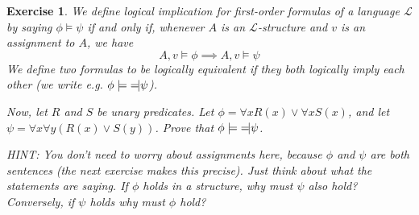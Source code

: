 \documentclass{article}
\theoremstyle{plain}
\newtheorem{Q}[theorem]{Exercise}{\bfseries}{\upshape}
\newcommand{\sL}{\mathscr{L}}
\newcommand{\lequiv}{\models\text{\reflectbox{$\models$}}}
\begin{document}
\begin{Q}\label{\prefix Q:models}
We define logical implication for first-order formulas of a language $\sL$ by saying $\phi\models \psi$ if and only if, whenever $A$ is an $\sL$-structure and $v$ is an assignment to $A$, we have 
\[A,v\models \phi\implies A,v\models \psi\]
We define two formulas to be logically equivalent if they both logically imply each other (we write e.g. $\phi\lequiv \psi$).

Now, let $R$ and $S$ be unary predicates. Let $\phi=\forall x R(x) \vee \forall x S(x)$, and let $\psi=\forall x \forall y (R(x)\vee S(y))$. Prove that $\phi\lequiv \psi$.

HINT: You don't need to worry about assignments here, because $\phi$ and $\psi$ are both sentences (the next exercise makes this precise). Just think about what the statements are saying. If $\phi$ holds in a structure, why must $\psi$ also hold? Conversely, if $\psi$ holds why must $\phi$ hold?
\end{Q}
\begin{comment}
\textbf{Solution:}
Let $A$ be a structure of the appropriate kind. Suppose first that $A\models \phi$. Then either every element of $A$ satisfies $R$, or every element of $A$ satisfies $S$. In the former case, for every pair of elements $a,b\in A$ we must have $R(a)\vee S(b)$, because $R(a)$ must be true. So $A\models \forall x\forall y(R(x)\vee S(y))$. This shows $\phi\models \psi$.

Conversely, suppose $A\models \psi$. Suppose that $A$ does not satisfy $\forall x R(x)$. Then there is $a\in A$ with $A\not\models R(a)$. In other words, $R(a)$ is not true. Since $A\models \forall x\forall y(R(x)\vee S(y))$, we must have $A\models \forall y(R(a)\vee S(y))$. As $R(a)$ is not true in $A$, it follows that $A\models \forall y S(y)$. By changing the variable name we have $A\models \forall x S(x)$, and so $A\models \forall x R(x) \vee \forall x S(x)$. This shows $\psi\models \phi$, and we are done.
\end{comment}
\end{document}
